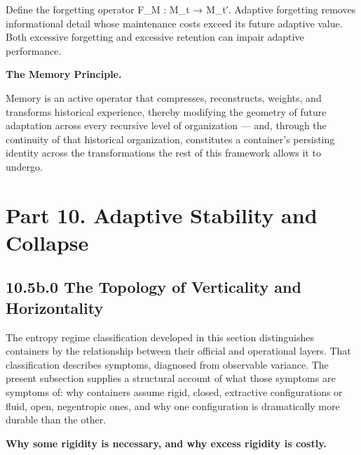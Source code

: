 \documentclass[
]{article}
\begin{document}
Define the forgetting operator F\_M : M\_t → M\_t′. Adaptive forgetting
removes informational detail whose maintenance costs exceed its future
adaptive value. Both excessive forgetting and excessive retention can
impair adaptive performance.

\textbf{The Memory Principle.}

Memory is an active operator that compresses, reconstructs, weights, and
transforms historical experience, thereby modifying the geometry of
future adaptation across every recursive level of organization --- and,
through the continuity of that historical organization, constitutes a
container's persisting identity across the transformations the rest of
this framework allows it to undergo.

\hypertarget{part-10.-adaptive-stability-and-collapse}{%
\section{Part 10. Adaptive Stability and
Collapse}\label{part-10.-adaptive-stability-and-collapse}}

\hypertarget{b.0-the-topology-of-verticality-and-horizontality}{%
\subsection{10.5b.0 The Topology of Verticality and
Horizontality}\label{b.0-the-topology-of-verticality-and-horizontality}}

The entropy regime classification developed in this section
distinguishes containers by the relationship between their official and
operational layers. That classification describes symptoms, diagnosed
from observable variance. The present subsection supplies a structural
account of what those symptoms are symptoms of: why containers assume
rigid, closed, extractive configurations or fluid, open, negentropic
ones, and why one configuration is dramatically more durable than the
other.

\textbf{Why some rigidity is necessary, and why excess rigidity is
costly.}
\end{document}
